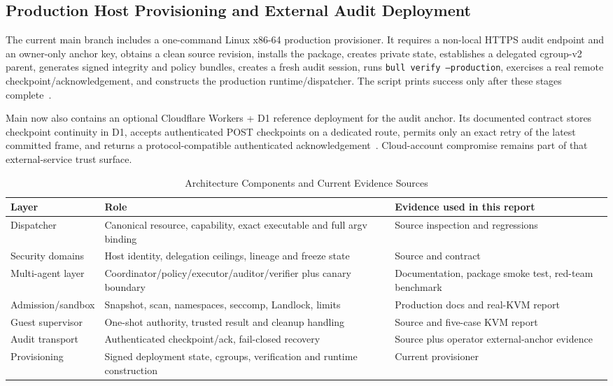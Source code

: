 \documentclass[journal]{IEEEtran}
\begin{document}
\subsection{Production Host Provisioning and External Audit Deployment}
The current main branch includes a one-command Linux x86-64 production provisioner. It requires a non-local HTTPS audit endpoint and an owner-only anchor key, obtains a clean source revision, installs the package, creates private state, establishes a delegated cgroup-v2 parent, generates signed integrity and policy bundles, creates a fresh audit session, runs \texttt{bull verify --production}, exercises a real remote checkpoint/acknowledgement, and constructs the production runtime/dispatcher. The script prints success only after these stages complete~\cite{BULL_Provisioner}.

Main now also contains an optional Cloudflare Workers + D1 reference deployment for the audit anchor. Its documented contract stores checkpoint continuity in D1, accepts authenticated POST checkpoints on a dedicated route, permits only an exact retry of the latest committed frame, and returns a protocol-compatible authenticated acknowledgement~\cite{BULL_CloudflareAudit}. Cloud-account compromise remains part of that external-service trust surface.

\begin{table}[!t]
\caption{Architecture Components and Current Evidence Sources}
\label{tab:architecture}
\centering
\small
\begin{tabularx}{\textwidth}{lYY}
\toprule
\textbf{Layer} & \textbf{Role} & \textbf{Evidence used in this report} \\
\midrule
Dispatcher & Canonical resource, capability, exact executable and full argv binding & Source inspection and regressions~\cite{BULL_Dispatcher,BULL_CI_Security} \\
Security domains & Host identity, delegation ceilings, lineage and freeze state & Source and contract~\cite{BULL_SecurityDomain} \\
Multi-agent layer & Coordinator/policy/executor/auditor/verifier plus canary boundary & Documentation, package smoke test, red-team benchmark~\cite{BULL_MultiAgent,BULL_Benchmark} \\
Admission/sandbox & Snapshot, scan, namespaces, seccomp, Landlock, limits & Production docs and real-KVM report~\cite{BULL_ProdSec,BULL_MicroVMReport} \\
Guest supervisor & One-shot authority, trusted result and cleanup handling & Source and five-case KVM report~\cite{BULL_GuestEngine,BULL_MicroVMReport} \\
Audit transport & Authenticated checkpoint/ack, fail-closed recovery & Source plus operator external-anchor evidence~\cite{BULL_AuditTransport,BULL_ExternalAudit} \\
Provisioning & Signed deployment state, cgroups, verification and runtime construction & Current provisioner~\cite{BULL_Provisioner} \\
\bottomrule
\end{tabularx}
\end{table}
\end{document}
